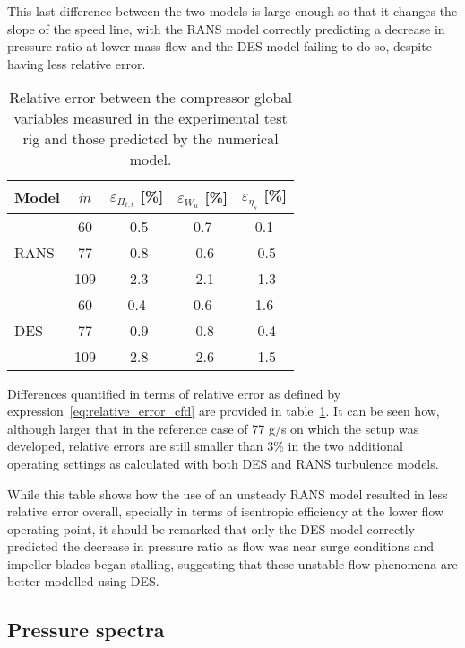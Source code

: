 This last difference between the two models is large enough so that it changes the slope of the speed line, with the RANS model correctly predicting a decrease in pressure ratio at lower mass flow and the DES model failing to do so, despite having less relative error.

\begin{table}[htb!]
\centering
\caption{Relative error between the compressor global variables measured in the experimental test rig and those predicted by the numerical model.}
\footnotesize
\begin{tabular}{lcccc}
\toprule
Model & $\dot{m}$ & $\varepsilon_{\varPi_{t,t}}$ [\%] & $\varepsilon_{W_u}$ [\%] & $\varepsilon_{\eta_s}$ [\%] \\ \midrule

\multirow{3}{*}{RANS} & 60 & -0.5 & 0.7 & 0.1  \\ 
					& 77 & -0.8 & -0.6 & -0.5  \\
					& 109 & -2.3 & -2.1 & -1.3  \\ \midrule
					
\multirow{3}{*}{DES} & 60 & 0.4 & 0.6 & 1.6  \\
					& 77 & -0.9 & -0.8 & -0.4  \\
					& 109 & -2.8 & -2.6 & -1.5  \\ \bottomrule
\end{tabular}
\label{tab:ops_globalVariables}
\end{table}

Differences quantified in terms of relative error as defined by expression~\ref{eq:relative_error_cfd} are provided in table~\ref{tab:ops_globalVariables}. It can be seen how, although larger that in the reference case of 77 g/s on which the setup was developed, relative errors are still smaller than 3\% in the two additional operating settings as calculated with both DES and RANS turbulence models.

While this table shows how the use of an unsteady RANS model resulted in less relative error overall, specially in terms of isentropic efficiency at the lower flow operating point, it should be remarked that only the DES model correctly predicted the decrease in pressure ratio as flow was near surge conditions and impeller blades began stalling, suggesting that these unstable flow phenomena are better modelled using DES. 

\subsection{Pressure spectra}

